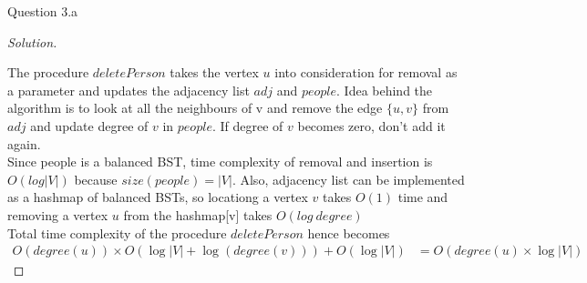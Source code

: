 \begin{solution}{Question 3.a}
\begin{proof}[Solution]
\begin{algorithm}[H]
\begin{algorithmic}[1]
                     
                        \EndIf{}
                        \EndIf{}
                        \EndIf{}
                    \EndWhile{}
                    \EndFor{}
                \EndProcedure{}
            \end{algorithmic}
        \end{algorithm}
        
        The procedure $deletePerson$ takes the vertex $u$ into consideration for removal as a parameter and updates the adjacency list $adj$ and $people$. Idea behind the algorithm is to look at all the neighbours of v and remove the edge $\{u,v\}$ from $adj$ and update degree of $v$ in $people$. If degree of $v$ becomes zero, don't add it again.\\
        Since people is a balanced BST, time complexity of removal and insertion is $O(log|V|)$ because $size(people)=|V|$. Also, adjacency list can be implemented as a hashmap of balanced BSTs, so locationg a vertex $v$ takes $O(1)$ time and removing a vertex $u$ from the hashmap[v] takes $O(log \ degree)$
        \\
        Total time complexity of the procedure $deletePerson$ hence becomes
        \begin{equation}
            \begin{split}
                O(degree(u))\times O(\log|V| +\log(degree(v)))+O(\log|V| )
                &=O(degree(u)\times \log|V|)
            \end{split}
        \end{equation}


\end{proof}
\end{solution}
